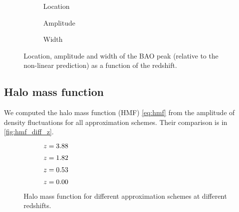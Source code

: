 \begin{figure}
\newcommand{\corrwidth}{0.70}
\centering
	\begin{subfigure}{\corrwidth\textwidth}
	\end{subfigure}
	\begin{subfigure}{\corrwidth\textwidth}
		\centering
		\caption{Location}
	\end{subfigure}
	\begin{subfigure}{\corrwidth\textwidth}
		\centering
		\caption{Amplitude}
	\end{subfigure}
	\begin{subfigure}{\corrwidth\textwidth}
		\centering
		\caption{Width}
	\end{subfigure}
	\caption{Location, amplitude and width of the BAO peak (relative to the non-linear prediction) as a function of the redshift.}
	\label{fig:corr_peak}
\end{figure}

\subsection{Halo mass function}
We computed the halo mass function (HMF) \eqref{eq:hmf} from the amplitude of density fluctuations for all approximation schemes. Their comparison is in \autoref{fig:hmf_diff_z}.

\begin{figure*}
	\centering
		\begin{subfigure}{1.0\textwidth}
		\end{subfigure}
		\begin{subfigure}{0.5\textwidth}
			\caption{$z=3.88$}
		\end{subfigure}%
		\begin{subfigure}{0.5\textwidth}
			\caption{$z=1.82$}
		\end{subfigure}
		\begin{subfigure}{0.5\textwidth}
			\caption{$z=0.53$}
		\end{subfigure}%
		\begin{subfigure}{0.5\textwidth}
			\caption{$z=0.00$}
		\end{subfigure}
		\caption{Halo mass function for different approximation schemes at different redshifts.}
		\label{fig:hmf_diff_z}
	\end{figure*}

